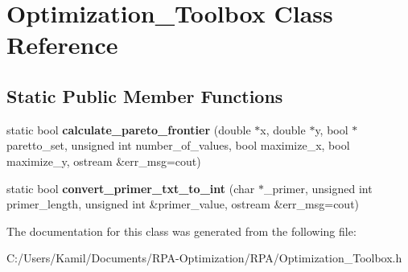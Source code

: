\hypertarget{class_optimization___toolbox}{}\section{Optimization\+\_\+\+Toolbox Class Reference}
\label{class_optimization___toolbox}
\subsection*{Static Public Member Functions}
\begin{DoxyCompactItemize}
\item 
\mbox{\label{class_optimization___toolbox_acb0793203243d200d9154f2e98011d44}} 
static bool {\bfseries calculate\+\_\+pareto\+\_\+frontier} (double $\ast$x, double $\ast$y, bool $\ast$paretto\+\_\+set, unsigned int number\+\_\+of\+\_\+values, bool maximize\+\_\+x, bool maximize\+\_\+y, ostream \&err\+\_\+msg=cout)
\item 
\mbox{\label{class_optimization___toolbox_a44f2c18904985dd9591efe0a63bfae9b}} 
static bool {\bfseries convert\+\_\+primer\+\_\+txt\+\_\+to\+\_\+int} (char $\ast$\+\_\+primer, unsigned int primer\+\_\+length, unsigned int \&primer\+\_\+value, ostream \&err\+\_\+msg=cout)
\end{DoxyCompactItemize}


The documentation for this class was generated from the following file\+:\begin{DoxyCompactItemize}
\item 
C\+:/\+Users/\+Kamil/\+Documents/\+R\+P\+A-\/\+Optimization/\+R\+P\+A/Optimization\+\_\+\+Toolbox.\+h\end{DoxyCompactItemize}
